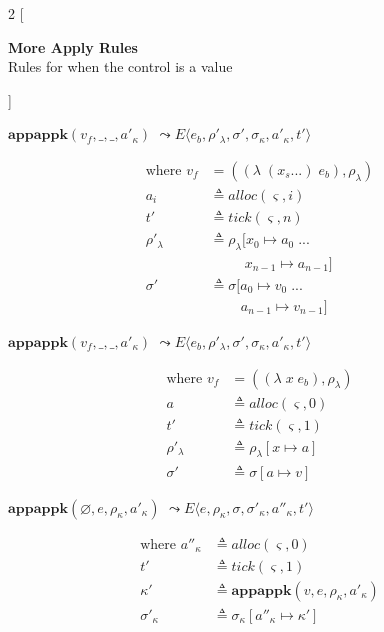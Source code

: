 \documentclass[12pt,draft]{article}
\newcommand{\lamsyn}[2]{(\lambda\;(#1 ...)\;#2)}
\newcommand{\vararglamsyn}[2]{(\lambda\;#1\;#2)}
\begin{document}
\begin{multicols*}{2}
[
\begin{center}
\textbf{More Apply Rules} \\
Rules for when the control is a value
\end{center}
]
\begin{center}
  $\textbf{appappk}(v_f, \_, \_, a'_\kappa)$
  $\leadsto E\langle e_b , \rho'_\lambda , \sigma',\sigma_\kappa,a'_\kappa,t' \rangle$
\end{center}
\vspace{-7mm}
\begin{align*}
  \text{where }
  v_f &= (\lamsyn{x_s}{e_b}, \rho_{\lambda}) \\
  a_i &\triangleq alloc(\varsigma, i) \\
  t' &\triangleq tick(\varsigma, n) \\
  \rho'_{\lambda} &\triangleq \rho_{\lambda}[x_0 \mapsto a_0\; ... \\
      &\;\;\;\;\;\;\;\;\;x_{n-1} \mapsto a_{n-1}] \\
  \sigma' &\triangleq \sigma[a_0 \mapsto v_0\;...\\
      &\;\;\;\;\;\;\;\;a_{n-1} \mapsto v_{n-1}]
\end{align*}
\begin{center}
  $\textbf{appappk}(v_f, \_, \_, a'_\kappa)$
  $\leadsto E\langle e_b , \rho'_\lambda,\sigma',\sigma_\kappa,a'_\kappa , t' \rangle$
\end{center}
\vspace{-7mm}
\begin{align*}
  \text{where }
  v_f &= (\vararglamsyn{x}{e_b}, \rho_{\lambda}) \\
  a &\triangleq alloc(\varsigma, 0) \\
  t' &\triangleq tick(\varsigma, 1) \\
  \rho'_{\lambda} &\triangleq \rho_{\lambda}[x \mapsto a] \\
  \sigma' &\triangleq \sigma[a \mapsto v]
\end{align*}
\begin{center}
  $\textbf{appappk}(\varnothing, e, \rho_\kappa, a'_\kappa)$
  $\leadsto E\langle e,\rho_\kappa,\sigma , \sigma'_\kappa , a''_\kappa , t' \rangle$
\end{center}
\vspace{-7mm}
\begin{align*}
  \text{where }
  a''_\kappa &\triangleq alloc(\varsigma, 0) \\
  t' &\triangleq tick(\varsigma, 1) \\
  \kappa' &\triangleq \textbf{appappk}(v, e, \rho_\kappa, a'_\kappa) \\
  \sigma'_\kappa &\triangleq \sigma_\kappa[a''_\kappa \mapsto \kappa']
\end{align*}


\end{multicols*}
\end{document}
